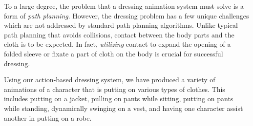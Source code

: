 
To a large degree, the problem that a dressing animation system must solve
is a form of \emph{path planning}.  However, the dressing problem has a
few unique challenges which are not addressed by standard path planning
algorithms.  Unlike typical path planning that avoids
collisions, contact between the body parts and the cloth is to be
expected. In fact, \emph{utilizing} contact to expand the opening of a folded
sleeve or fixate a part of cloth on the body is crucial for
successful dressing.


Using our action-based dressing system, we have produced a variety of
animations of a character that is putting on various types of clothes.
This includes putting on a jacket, pulling on pants while sitting, putting
on pants while standing, dynamically swinging on a vest, and having one character assist another in putting on a robe.


